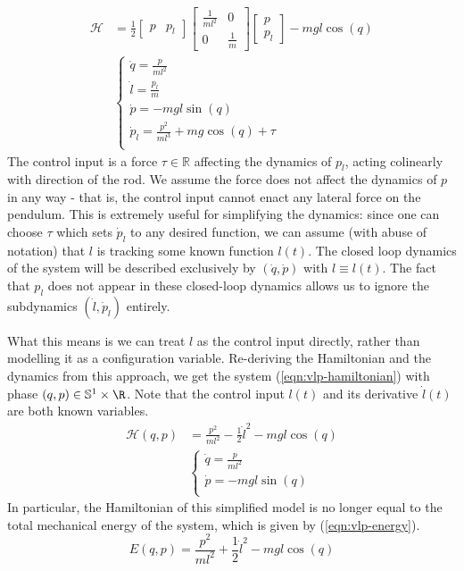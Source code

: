 \begin{align}\label{eqn:vlp-hamiltonian-with-pl}
   \mathcal{H} &= \frac{1}{2} \begin{bmatrix} p & p_l \end{bmatrix}
      \begin{bmatrix}
         \frac{1}{ml^2}  & 0 \\
         0 & \frac{1}{m}
      \end{bmatrix} \begin{bmatrix} p \\ p_l \end{bmatrix} - mgl\cos(q) \\
     &\begin{cases}
        \dot{q} = \frac{p}{ml^2} \\
        \dot{l} = \frac{p_l}{m} \\
        \dot{p} = -mgl\sin(q) \\
        \dot{p}_l = \frac{p^2}{ml^3} + mg\cos(q) + \tau \\
   \end{cases} \nonumber
\end{align}
The control input is a force \(\tau \in \mathbb{R}\) affecting the dynamics of
\(p_l\), acting colinearly with direction of the rod.
We assume the force does not affect the dynamics of \(p\) in any way -
that is, the control input cannot enact any lateral force on the pendulum.
This is extremely useful for simplifying the dynamics: since one can choose
\(\tau\) which sets \(\dot{p}_l\) to any desired function, we can assume (with abuse
of notation) that \(l\) is tracking some known function \(l(t)\). 
The closed loop dynamics of the system will be described exclusively by
\((\dot{q},\dot{p})\) with \(l \equiv l(t)\).
The fact that \(p_l\) does not appear in these closed-loop dynamics allows us to
ignore the subdynamics \((\dot{l},\dot{p}_l)\) entirely. 

What this means is we can treat \(l\) as the control input directly, rather than
modelling it as a configuration variable. Re-deriving the Hamiltonian and the
dynamics from this approach, we get the system 
(\ref{eqn:vlp-hamiltonian}) with phase \((q,p) \in \mathbb{S}^1 \times \R\). 
Note that the control input \(l(t)\) and its derivative \(\dot{l}(t)\) are both
known variables.
\begin{align}\label{eqn:vlp-hamiltonian}
   \mathcal{H}(q,p) &= \frac{p^2}{ml^2} - \frac{1}{2}\dot{l}^2 - mgl\cos(q) \\
     &\begin{cases}
        \dot{q} = \frac{p}{ml^2} \\
        \dot{p} = -mgl\sin(q) \\
      \end{cases}\nonumber
\end{align}
In particular, the Hamiltonian of this simplified model is no longer equal to
the total mechanical energy of the system, which is given by
(\ref{eqn:vlp-energy}).
\begin{equation}\label{eqn:vlp-energy}
   E(q,p) = \frac{p^2}{ml^2} + \frac{1}{2}\dot{l}^2 - mgl\cos(q)
\end{equation}

